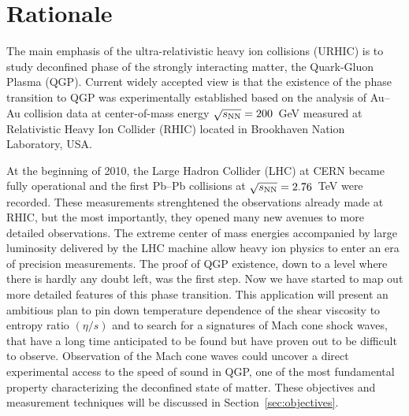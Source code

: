 
\section{Rationale}%
\label{sec:rationale}
The main emphasis of the ultra-relativistic heavy ion collisions (URHIC) is to study deconfined phase of the strongly interacting matter, the Quark-Gluon Plasma (QGP). Current widely accepted view is that the existence of the phase transition to QGP was experimentally established based on the analysis of  Au--Au collision data at center-of-mass energy $\sqrt{s_{\rm NN}}=200$~GeV measured at Relativistic Heavy Ion Collider (RHIC) located in Brookhaven Nation Laboratory, USA.

At the beginning of 2010, the Large Hadron Collider (LHC) at CERN became fully operational and the first Pb--Pb collisions at $\sqrt{s_{\rm NN}}=2.76$~TeV were recorded.  These measurements strenghtened the observations already made at RHIC, but the most importantly, they opened many new avenues to more detailed observations. 
The extreme center of mass energies accompanied by large luminosity delivered by the LHC machine allow heavy ion physics to enter an era of precision measurements. 
The proof of QGP existence, down to a level where there is hardly any doubt left, was the first step. 
Now we have started to map out more detailed features of this phase transition.
This application will present an ambitious plan to pin down temperature dependence of the shear viscosity to entropy ratio $(\eta/s)$ and to search for a signatures of Mach cone shock waves, that have a long time anticipated to be found but have proven out to be difficult to observe. 
Observation of the Mach cone waves could uncover a direct experimental access to the speed of sound in QGP, one of the most fundamental property characterizing the deconfined state of matter. 
These objectives and measurement techniques will be discussed in Section~\ref{sec:objectives}.

